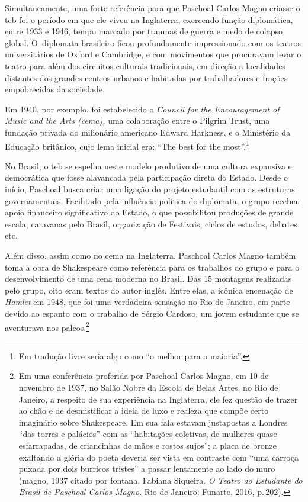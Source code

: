 Simultaneamente, uma forte referência para que Paschoal Carlos Magno
criasse o {\sc teb} foi o período em que ele viveu na Inglaterra, exercendo
função diplomática, entre 1933 e 1946, tempo marcado por traumas de
guerra e medo de colapso global. O~diplomata brasileiro ficou
profundamente impressionado com os teatros universitários de Oxford e
Cambridge, e com movimentos que procuravam levar o teatro para além dos
circuitos culturais tradicionais, em direção a localidades distantes dos
grandes centros urbanos e habitadas por trabalhadores e frações
empobrecidas da sociedade.

Em 1940, por exemplo, foi estabelecido o {\it Council for the
Encouragement of Music and the Arts ({\sc cema}),} uma colaboração entre o
Pilgrim Trust, uma fundação privada do milionário americano Edward
Harkness, e o Ministério da Educação britânico, cujo lema inicial era:
“The best for the most”.\footnote{Em tradução livre seria algo como “o
  melhor para a maioria”.}

No Brasil, o {\sc teb} se espelha neste modelo produtivo de uma cultura
expansiva e democrática que fosse alavancada pela participação direta do
Estado. Desde o início, Paschoal busca criar uma ligação do projeto
estudantil com as estruturas governamentais. Facilitado pela influência
política do diplomata, o grupo recebeu apoio financeiro significativo do
Estado, o que possibilitou produções de grande escala, caravanas pelo
Brasil, organização de Festivais, ciclos de estudos, debates etc.

Além disso, assim como no {\sc cema} na Inglaterra, Paschoal Carlos Magno
também toma a obra de Shakespeare como referência para os trabalhos do
grupo e para o desenvolvimento de uma cena moderna no Brasil. Das 15
montagens realizadas pelo grupo, oito eram textos do autor inglês. Entre
elas, a icônica encenação de {\it Hamlet} em 1948, que foi uma
verdadeira sensação no Rio de Janeiro, em parte devido ao espanto com o
trabalho de Sérgio Cardoso, um jovem estudante que se aventurava nos
palcos.\footnote{Em uma conferência proferida por Paschoal Carlos Magno,
  em 10 de novembro de 1937, no Salão Nobre da Escola de Belas Artes, no
  Rio de Janeiro, a respeito de sua experiência na Inglaterra, ele fez
  questão de trazer ao chão e de desmistificar a ideia de luxo e realeza
  que compõe certo imaginário sobre Shakespeare. Em sua fala estavam
  justapostas a Londres “das torres e palácios” com as “habitações
  coletivas, de mulheres quase esfarrapadas, de criancinhas de mãos e
  rostos sujos”; a placa de bronze exaltando a glória do poeta deveria
  ser vista em contraste com “uma carroça puxada por dois burricos
  tristes” a passar lentamente ao lado do muro ({\sc magno}, 1937 citado por
  {\sc fontana}, Fabiana Siqueira. {\it O Teatro do Estudante do Brasil de
  Paschoal Carlos Magno}. Rio de Janeiro: Funarte, 2016, p.\,202).}

